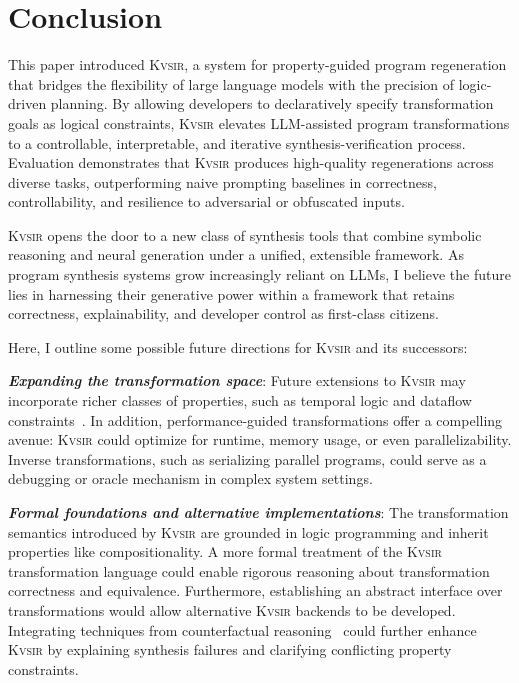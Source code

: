 \documentclass[nonacm,sigplan,review]{acmart}
\newcommand{\sys}{{\scshape Kv{\textalpha}sir}\xspace}
\newcommand{\heading}[1]{\vspace{2pt}\noindent\textbf{\emph{#1}}:\enspace}
\begin{document}

\section{Conclusion}
This paper introduced \sys, a system for property-guided program regeneration
that bridges the flexibility of large language models with the precision of
logic-driven planning.
By allowing developers to declaratively specify
transformation goals as logical constraints, \sys elevates LLM-assisted program
transformations to a controllable, interpretable, and iterative synthesis-verification
process.
Evaluation demonstrates that \sys produces high-quality regenerations
across diverse tasks, outperforming naive prompting baselines in correctness,
controllability, and resilience to adversarial or obfuscated inputs.

\sys opens the door to a new class of synthesis tools that combine symbolic
reasoning and neural generation under a unified, extensible framework.
As program synthesis systems grow increasingly reliant on LLMs, I believe the
future lies in harnessing their generative power within a framework that retains
correctness, explainability, and developer control as first-class citizens.

Here, I outline some possible future directions for \sys and its successors:

\heading{Expanding the transformation space}
Future extensions to \sys may incorporate richer classes of properties, such as
temporal logic and dataflow
constraints~\cite{azzopardi2023ltl,handa2021orderawaredataflowmodelparallel}.
In addition, performance-guided transformations offer a compelling avenue: \sys
could optimize for runtime, memory usage, or even parallelizability.
Inverse
transformations, such as serializing parallel programs, could serve as
a debugging or oracle mechanism in complex system settings.

\heading{Formal foundations and alternative implementations}
The transformation semantics introduced by \sys are grounded in logic
programming and inherit properties like compositionality.
A more formal treatment of the \sys
transformation language could enable rigorous reasoning about transformation
correctness and equivalence.
Furthermore, establishing an abstract interface
over transformations would allow alternative \sys backends to be developed.
Integrating techniques from
counterfactual reasoning~\cite{Cabalar_2020} could further enhance \sys by
explaining synthesis failures and clarifying conflicting property constraints.
\end{document}
